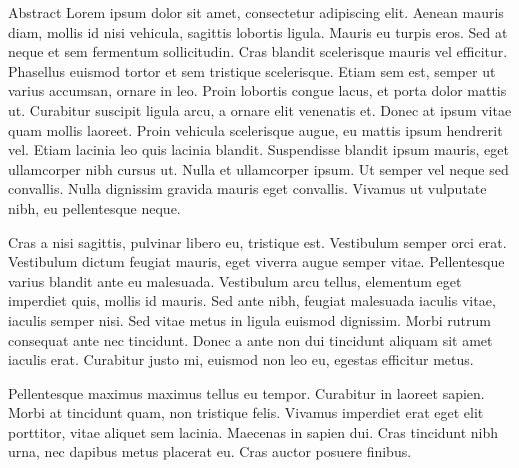 
Abstract  Lorem ipsum dolor sit amet, consectetur adipiscing elit. Aenean mauris diam, mollis id nisi vehicula, sagittis lobortis ligula. Mauris eu turpis eros. Sed at neque et sem fermentum sollicitudin. Cras blandit scelerisque mauris vel efficitur. Phasellus euismod tortor et sem tristique scelerisque. Etiam sem est, semper ut varius accumsan, ornare in leo. Proin lobortis congue lacus, et porta dolor mattis ut. Curabitur suscipit ligula arcu, a ornare elit venenatis et. Donec at ipsum vitae quam mollis laoreet. Proin vehicula scelerisque augue, eu mattis ipsum hendrerit vel. Etiam lacinia leo quis lacinia blandit. Suspendisse blandit ipsum mauris, eget ullamcorper nibh cursus ut. Nulla et ullamcorper ipsum. Ut semper vel neque sed convallis. Nulla dignissim gravida mauris eget convallis. Vivamus ut vulputate nibh, eu pellentesque neque.

Cras a nisi sagittis, pulvinar libero eu, tristique est. Vestibulum semper orci erat. Vestibulum dictum feugiat mauris, eget viverra augue semper vitae. Pellentesque varius blandit ante eu malesuada. Vestibulum arcu tellus, elementum eget imperdiet quis, mollis id mauris. Sed ante nibh, feugiat malesuada iaculis vitae, iaculis semper nisi. Sed vitae metus in ligula euismod dignissim. Morbi rutrum consequat ante nec tincidunt. Donec a ante non dui tincidunt aliquam sit amet iaculis erat. Curabitur justo mi, euismod non leo eu, egestas efficitur metus.

Pellentesque maximus maximus tellus eu tempor. Curabitur in laoreet sapien. Morbi at tincidunt quam, non tristique felis. Vivamus imperdiet erat eget elit porttitor, vitae aliquet sem lacinia. Maecenas in sapien dui. Cras tincidunt nibh urna, nec dapibus metus placerat eu. Cras auctor posuere finibus. 